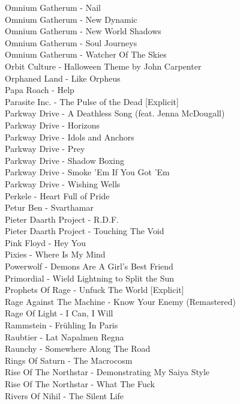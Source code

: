 Omnium Gatherum - Nail\\
Omnium Gatherum - New Dynamic\\
Omnium Gatherum - New World Shadows\\
Omnium Gatherum - Soul Journeys\\
Omnium Gatherum - Watcher Of The Skies\\
Orbit Culture - Halloween Theme by John Carpenter\\
Orphaned Land - Like Orpheus\\
Papa Roach - Help\\
Parasite Inc. - The Pulse of the Dead [Explicit]\\
Parkway Drive - A Deathless Song (feat. Jenna McDougall)\\
Parkway Drive - Horizons\\
Parkway Drive - Idols and Anchors\\
Parkway Drive - Prey\\
Parkway Drive - Shadow Boxing\\
Parkway Drive - Smoke 'Em If You Got 'Em\\
Parkway Drive - Wishing Wells\\
Perkele - Heart Full of Pride\\
Petur Ben - Svarthamar\\
Pieter Daarth Project - R.D.F.\\
Pieter Daarth Project - Touching The Void\\
Pink Floyd - Hey You\\
Pixies - Where Is My Mind\\
Powerwolf - Demons Are A Girl's Best Friend\\
Primordial - Wield Lightning to Split the Sun\\
Prophets Of Rage - Unfuck The World [Explicit]\\
Rage Against The Machine - Know Your Enemy (Remastered)\\
Rage Of Light - I Can, I Will\\
Rammstein - Frühling In Paris\\
Raubtier - Lat Napalmen Regna\\
Raunchy - Somewhere Along The Road\\
Rings Of Saturn - The Macrocosm\\
Rise Of The Northstar - Demonstrating My Saiya Style\\
Rise Of The Northstar - What The Fuck\\
Rivers Of Nihil - The Silent Life\\

